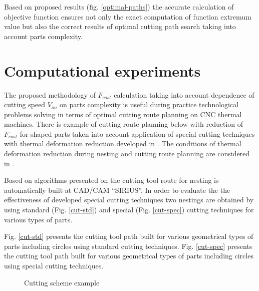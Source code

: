 \documentclass[runningheads]{llncs}
\begin{document}
Based on proposed results (fig. \ref{optimal-paths})
the accurate calculation of objective function ensures
not only the exact computation of function extremum value
but also the correct results of optimal cutting path search
taking into account parts complexity.

\section{Computational experiments}

The proposed methodology of
$F_{cost}$
calculation taking into account dependence of cutting speed
$V_{on}$
on parts complexity is useful during
practice technological problems solving
in terms of optimal cutting route planning on CNC thermal machines.
There is example of cutting route planning below with reduction of
$F_{cost}$
for shaped parts taken into account
application of special cutting techniques
with thermal deformation reduction developed in \cite{ru26}.
The conditions of thermal deformation reduction
during nesting and cutting route planning are considered in \cite{ru01}.

Based on algorithms presented on \cite{ru26}
the cutting tool route for nesting is automatically built at CAD/CAM ``SIRIUS''.
In order to evaluate the the effectiveness of developed special cutting techniques
two nestings are obtained by using standard (Fig. \ref{cut-std})
and special (Fig. \ref{cut-spec})
cutting techniques for various types of parts.

Fig. \ref{cut-std} presents the cutting tool path
built for various geometrical types of parts including circles using standard cutting techniques.
Fig. \ref{cut-spec} presents the cutting tool path built for various geometrical types of parts
including circles using special cutting techniques.

\begin{figure}
  \centering
  \caption{Cutting scheme example}
  \label{cutting}
\end{figure}
\end{document}
